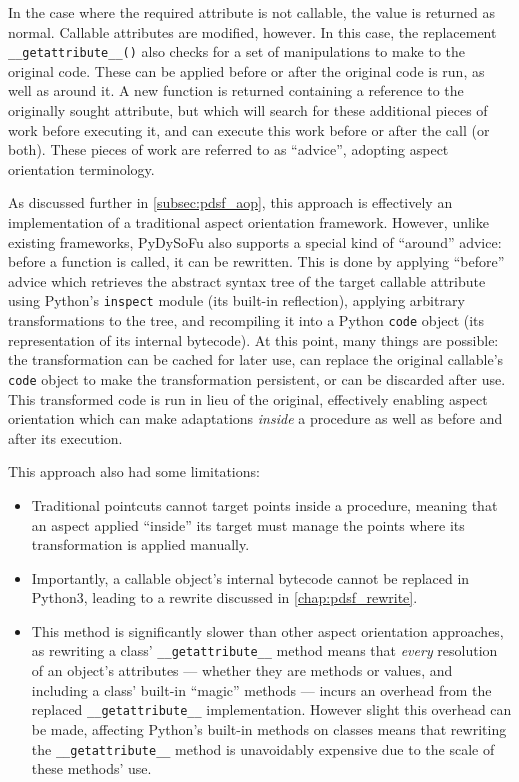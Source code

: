 
In the case where the required attribute is not callable, the value is returned
as normal. Callable attributes are modified, however. In this case, the
replacement \lstinline{__getattribute__()} also checks for a set of
manipulations to make to the original code. These can be applied before or after
the original code is run, as well as around it. A new function is returned
containing a reference to the originally sought attribute, but which will search
for these additional pieces of work before executing it, and can execute this
work before or after the call (or both). These pieces of work are referred to as
``advice'', adopting aspect orientation terminology.

As discussed further in \cref{subsec:pdsf_aop}, this approach is effectively an
implementation of a traditional aspect orientation framework. However, unlike
existing frameworks, PyDySoFu also supports a special kind of ``around'' advice:
before a function is called, it can be rewritten. This is done by applying
``before'' advice which retrieves the abstract syntax tree of the target
callable attribute using Python's \lstinline{inspect} module (its built-in
reflection), applying arbitrary transformations to the tree, and recompiling it
into a Python \lstinline{code} object (its representation of its
internal bytecode). At this point, many things are possible: the transformation
can be cached for later use, can replace the original callable's
\lstinline{code} object to make the transformation persistent, or can be
discarded after use. This transformed code is run in lieu of the original,
effectively enabling aspect orientation which can make adaptations \emph{inside}
a procedure as well as before and after its execution.

This approach also had some limitations:

\begin{itemize}
    \item Traditional pointcuts cannot target points inside a procedure, meaning
    that an aspect applied ``inside'' its target must manage the points where
    its transformation is applied manually.
    \item Importantly, a callable object's internal bytecode cannot be replaced
    in Python3, leading to a rewrite discussed in \cref{chap:pdsf_rewrite}.
    \item This method is significantly slower than other aspect orientation
    approaches, as rewriting a class' \lstinline{__getattribute__} method means
    that \emph{every} resolution of an object's attributes --- whether they are
    methods or values, and including a class' built-in ``magic'' methods ---
    incurs an overhead from the replaced \lstinline{__getattribute__}
    implementation. However slight this overhead can be made, affecting Python's
    built-in methods on classes means that rewriting the
    \lstinline{__getattribute__} method is unavoidably expensive due to the
    scale of these methods' use.
\end{itemize}

